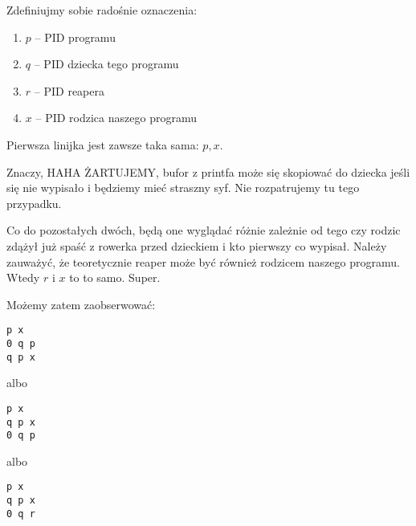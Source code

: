 Zdefiniujmy sobie radośnie oznaczenia:
\begin{enumerate}
	\item $p$ -- PID programu
	\item $q$ -- PID dziecka tego programu
	\item $r$ -- PID reapera
	\item $x$ -- PID rodzica naszego programu
\end{enumerate}

Pierwsza linijka jest zawsze taka sama: \(p, x\).

Znaczy, HAHA ŻARTUJEMY, bufor z printfa może się skopiować do dziecka jeśli się nie wypisało i będziemy mieć straszny syf. Nie rozpatrujemy tu tego przypadku.

Co do pozostałych dwóch, będą one wyglądać różnie zależnie od tego czy rodzic zdążył już spaść z rowerka przed dzieckiem i kto pierwszy co wypisał. Należy zauważyć, że teoretycznie reaper może być również rodzicem naszego programu. Wtedy $r$ i $x$ to to samo. Super.

Możemy zatem zaobserwować:

\texttt{p x \\ 0 q p \\ q p x}

albo

\texttt{p x \\ q p x \\ 0 q p}

albo

\texttt{p x \\ q p x \\ 0 q r}